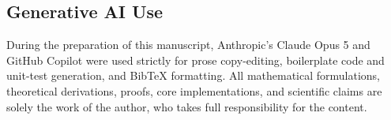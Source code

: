 \subsection*{Generative AI Use}
During the preparation of this manuscript, Anthropic's Claude Opus 5 and GitHub Copilot were used strictly for prose copy-editing, boilerplate code and unit-test generation, and BibTeX formatting. All mathematical formulations, theoretical derivations, proofs, core implementations, and scientific claims are solely the work of the author, who takes full responsibility for the content.





